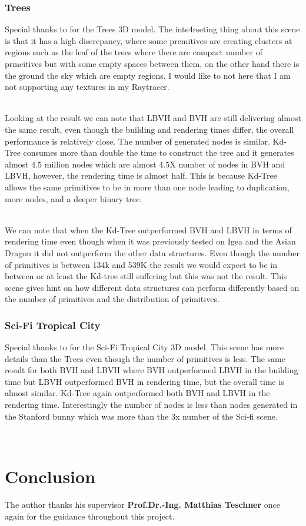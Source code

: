 \documentclass[11pt,a4paper]{article}
\begin{document}
\subsubsection{Trees}
Special thanks to \cite{trees} for the Trees 3D model. The inte4rseting thing about this scene is that it has a high discrepancy, where some premitives are creating clusters at regions such as the leaf of the trees where there are compact number of prmeitives but with some empty spaces between them, on the other hand there is the ground the sky which are empty regions. I would like to not here that I am not supporting any textures in my Raytracer. 

\noindent
\\
Looking at the result we can note that LBVH and BVH are still delivering almost the same result, even though the building and rendering times differ, the overall performance is relatively close. The number of generated nodes is similar. Kd-Tree consumes more than double the time to construct the tree and it generates almost 4.5 million nodes which are almost 4.5X number of nodes in BVH and LBVH, however, the rendering time is almost half. This is because Kd-Tree allows the same primitives to be in more than one node leading to duplication, more nodes, and a deeper binary tree. 

\noindent
\\
We can note that when the Kd-Tree outperformed BVH and LBVH in terms of rendering time even though when it was previously tested on Igea and the Asian Dragon it did not outperform the other data structures. Even though the number of primitives is between 134k and 539K the result we would expect to be in between or at least the Kd-tree still suffering but this was not the result. This scene gives hint on how different data structures can perform differently based on the number of primitives and the distribution of primitives. 
\subsubsection{Sci-Fi Tropical City}
Special thanks to \cite{scifi} for the Sci-Fi Tropical City 3D model.
This scene has more details than the Trees even though the number of primitives is less. The same result for both BVH and LBVH where BVH outperformed LBVH in the building time but LBVH outperformed BVH in rendering time, but the overall time is almost similar. Kd-Tree again outperformed both BVH and LBVH in the rendering time. Interestingly the number of nodes is less than nodes generated in the Stanford bunny which was more than the 3x number of the Sci-fi scene. 

\noindent
\\
\clearpage

\section{Conclusion}
The author thanks his supervisor \textbf{Prof.Dr.-Ing. Matthias Teschner} once again for the guidance throughout this project.
	
\clearpage



\end{document}
